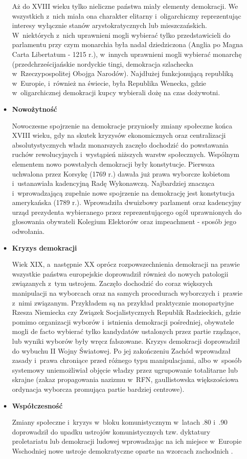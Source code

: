 \begin{itemize}
Aż do XVIII wieku tylko nieliczne państwa miały elementy demokracji. We wszystkich z~nich miała ona charakter elitarny i~oligarchiczny reprezentując interesy wyłącznie stanów arystokratycznych lub mieszczańskich. W~niektórych z~nich uprawnieni mogli wybierać tylko przedstawicieli do parlamentu przy czym monarchia była nadal dziedziczona (Anglia po Magna Carta Libertatum - 1215 r.), w~innych uprawnieni mogli wybierać monarchę (przedchrześcijańskie nordyckie tingi, demokracja szlachecka w~Rzeczypospolitej Obojga Narodów). Najdłużej funkcjonującą republiką w~Europie, i~również na świecie, była Republika Wenecka, gdzie w~oligarchicznej demokracji kupcy wybierali dożę na czas dożywotni.

\item{\textbf{Nowożytność}}

Nowoczesne spojrzenie na demokracje przyniosły zmiany społeczne końca XVIII wieku, gdy na skutek kryzysów ekonomicznych oraz centralizacji absolutystycznych władz monarszych zaczęło dochodzić do powstawania ruchów rewolucyjnych i~wystąpień niższych warstw społecznych. Wspólnym elementem nowo powstałych demokracji były konstytucje. Pierwsza uchwalona przez Korsykę (1769 r.) dawała już prawa wyborcze kobietom i~ustanawiała kadencyjną Radę Wykonawczą. Najbardziej znacząca i~wprowadzającą zupełnie nowe spojrzenie na demokrację jest konstytucja amerykańska (1789 r.). Wprowadziła dwuizbowy parlament oraz kadencyjny urząd prezydenta wybieranego przez reprezentującego ogół uprawnionych do głosowania obywateli Kolegium Elektorów oraz impeachment - sposób jego odwołania.

\item{\textbf{Kryzys demokracji}}

Wiek XIX, a~następnie XX oprócz rozpowszechnienia demokracji na prawie wszystkie państwa europejskie doprowadził również do nowych patologii związanych z~tym ustrojem. Zaczęło dochodzić do coraz większych manipulacji na wyborcach oraz na samych procedurach wyborczych i~prawie z~nimi związanym. Przykładem są na przykład praktycznie monopartyjne Rzesza Niemiecka czy Związek Socjalistycznych Republik Radzieckich, gdzie pomimo organizacji wyborów i~istnienia demokracji pośredniej, obywatele mogli de facto wybierać tylko kandydatów ustalonych przez partie rządzące, lub wyniki wyborów były wręcz fałszowane. Kryzys demokracji doprowadził do wybuchu II Wojny Światowej. Po jej zakończeniu Zachód wprowadzał zasady i~prawa chroniące przed różnego typu manipulacjami, albo w~sposób systemowy uniemożliwiał objęcie władzy przez ugrupowanie totalitarne lub skrajne (zakaz propagowania nazizmu w~RFN, gaullistowska większościowa ordynacja wyborcza promująca partie bardziej centrowe).

\item{\textbf{Współczesność}}

Zmiany społeczne i~kryzys w~bloku komunistycznym w~latach .80 i~.90 doprowadził do upadku ustrojów komunistycznych tzw. dyktatury proletariatu lub demokracji ludowej wprowadzając na ich miejsce w~Europie Wschodniej nowe ustroje demokratyczne oparte na wzorcach zachodnich \cite{Górski}.
\end{itemize}

